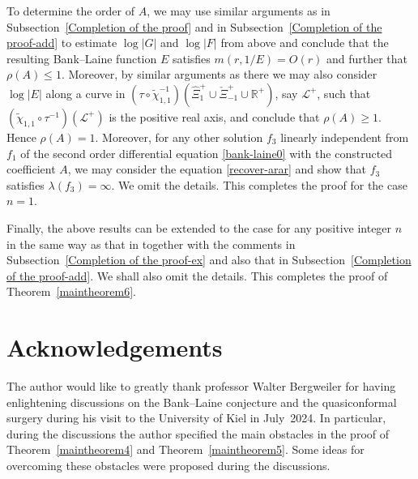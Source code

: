 \documentclass[12pt]{amsart}
\numberwithin{equation}{section}
\begin{document}
To determine the order of $A$, we may use similar arguments as in Subsection~\ref{Completion of the proof} and in Subsection~\ref{Completion of the proof-add} to estimate $\log|G|$ and $\log|F|$ from above and conclude that the resulting Bank--Laine function $E$ satisfies $m(r,1/E)=O(r)$ and further that $\rho(A)\leq 1$. Moreover, by similar arguments as there we may also consider $\log|E|$ along a curve in $(\tau\circ\tilde{\chi}_{1,1}^{-1})(\hat{\Xi}_1^{+}\cup\check{\Xi}_{-1}^{+}\cup \mathbb{R}^{+})$, say $\mathcal{L}^{+}$, such that $(\tilde{\chi}_{1,1}\circ\tau^{-1})(\mathcal{L}^{+})$ is the positive real axis, and conclude that $\rho(A)\geq 1$. Hence $\rho(A)=1$. Moreover, for any other solution $f_3$ linearly independent from $f_1$ of the second order differential equation \eqref{bank-laine0} with the constructed coefficient $A$, we may consider the equation \eqref{recover-arar} and show that $f_3$ satisfies $\lambda(f_3)=\infty$. We omit the details. This completes the proof for the case $n=1$.

Finally, the above results can be extended to the case for any positive integer $n$ in the same way as that in \cite[Section~5]{Bergweilereremenko2019} together with the comments in Subsection~\ref{Completion of the proof-ex} and also that in Subsection~\ref{Completion of the proof-add}. We shall also omit the details. This completes the proof of Theorem~\ref{maintheorem6}.


\section{Acknowledgements}

The author would like to greatly thank professor Walter Bergweiler for having enlightening discussions on the Bank--Laine conjecture and the quasiconformal surgery during his visit to the University of Kiel in July~2024. In particular, during the discussions the author specified the main obstacles in the proof of Theorem~\ref{maintheorem4} and Theorem~\ref{maintheorem5}. Some ideas for overcoming these obstacles were proposed during the discussions.
\end{document}
